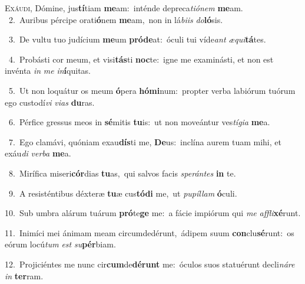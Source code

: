 \lettrine{\initial\textcolor{\initialcolor}{E}}{xáudi,} Dómine, jus\-\textbf{tí}\-tiam \textbf{me}\-am:~\star inténde depreca\-\textit{ti}\-\textit{ó}\textit{nem} \textbf{me}\-am.\\
{\numbfont\textcolor{\numbcolor}{~2.}}~Auribus pércipe orati\-\textbf{ó}\-nem \textbf{me}\-am,~\star non in lá\-\textit{bi}\-\textit{is} \textit{do}\-\textbf{ló}sis.\par
{\numbfont\textcolor{\numbcolor}{~3.}}~De vultu tuo judícium \textbf{me}\-um \textbf{pród}\-\textbf{e}at:~\star óculi tui víde\textit{ant} \textit{æ}\-\textit{qui}\textbf{tá}tes.\par
{\numbfont\textcolor{\numbcolor}{~4.}}~Probásti cor meum, et visi\-\textbf{tás}\-ti \textbf{noc}\-te:~\star igne me examinásti, et non est invénta \textit{in} \textit{me} \textit{in}\-\textbf{í}quitas.\par
{\numbfont\textcolor{\numbcolor}{~5.}}~Ut non loquátur os meum \textbf{ó}\-pera \textbf{hó}\-\textbf{mi}num:~\star propter verba labiórum tuórum ego custodí\textit{vi} \textit{vi}\-\textit{as} \textbf{du}\-ras.\par
{\numbfont\textcolor{\numbcolor}{~6.}}~Pérfice gressus meos in \textbf{sé}\-mitis \textbf{tu}\-is:~\star ut non moveántur ves\-\textit{tí}\-\textit{gi}\textit{a} \textbf{me}\-a.\par
{\numbfont\textcolor{\numbcolor}{~7.}}~Ego clamávi, quóniam exau\-\textbf{dís}\-ti me, \textbf{De}\-us:~\star inclína aurem tuam mihi, et exáu\textit{di} \textit{ver}\-\textit{ba} \textbf{me}\-a.\par
{\numbfont\textcolor{\numbcolor}{~8.}}~Mirífica miseri\-\textbf{cór}\-dias \textbf{tu}\-as,~\star qui salvos facis \textit{spe}\-\textit{rán}\textit{tes} \textbf{in} te.\par
{\numbfont\textcolor{\numbcolor}{~9.}}~A resisténtibus déxteræ \textbf{tu}\-æ cus\-\textbf{tó}\-\textbf{di} me,~\star ut \textit{pu}\-\textit{píl}\textit{lam} \textbf{ó}\-culi.\par
{\numbfont\textcolor{\numbcolor}{10.}}~Sub umbra alárum tuárum \textbf{pró}\-te\textbf{ge} me:~\star a fácie impiórum qui \textit{me} \textit{af}\-\textit{fli}\textbf{xé}runt.\par
{\numbfont\textcolor{\numbcolor}{11.}}~Inimíci mei ánimam meam circumdedérunt,~\dagger ádipem suum \textbf{con}\-clu\-\textbf{sé}\-runt:~\star os eórum locú\textit{tum} \textit{est} \textit{su}\-\textbf{pér}biam.\par
{\numbfont\textcolor{\numbcolor}{12.}}~Projiciéntes me nunc cir\-\textbf{cum}\-de\-\textbf{dé}\-\textbf{runt} me:~\star óculos suos statuérunt decli\-\textit{ná}\-\textit{re} \textit{in} \textbf{ter}\-ram.\par
